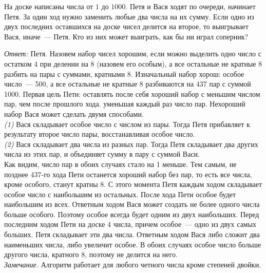 На доске написаны числа от $1$ до $1000$.
Петя и Вася ходят по очереди, начинает Петя.
За один ход нужно заменить любые два числа на их сумму.
Если одно из двух последних оставшихся на доске чисел делится на второе, то
выигрывает Вася, иначе~--- Петя.
Кто из них может выиграть, как бы ни играл соперник?

\solution
\emph{Ответ:} Петя.
Назовем набор чисел хорошим, если можно выделить одно число с остатком 4 при
делении на 8 (назовем его особым), а все остальные не кратные 8 разбить на пары
с суммами, кратными 8.
Изначальный набор хорош: особое число~--- 500, а все остальные не кратные 8
разбиваются на 437 пар с суммой 1000.
Первая цель Пети: оставлять после себя хороший набор с меньшим числом пар, чем
после прошлого хода. уменьшая каждый раз число пар.
Нехороший набор Вася может сделать двумя способами.
\\\emph{(1)}
Вася складывает особое число с числом из пары.
Тогда Петя прибавляет к результату второе число пары, восстанавливая особое
число.
\\\emph{(2)}
Вася складывает два числа из разных пар.
Тогда Петя складывает два других числа из этих пар, и объединяет сумму в пару с
суммой Васи.
\\
Как видим, число пар в обоих случаях стало на 1 меньше.
Тем самым, не позднее 437-го хода Пети останется хороший набор без пар, то есть
все числа, кроме особого, станут кратны 8.
С этого момента Петя каждым ходом складывает особое число с наибольшим из
остальных.
После хода Пети особое будет наибольшим из всех.
Ответным ходом Вася может создать не более одного числа больше особого.
Поэтому особое всегда будет одним из двух наибольших.
Перед последним ходом Пети на доске 4 числа, причем особое~--- одно из двух
самых больших.
Петя складывает эти два числа.
Ответным ходом Вася либо сложит два наименьших числа, либо увеличит особое.
В обоих случаях особое число больше другого числа, кратного 8, поэтому не
делится на него.
\\
\emph{Замечание.}
Алгоритм работает для любого четного числа кроме степеней двойки.

